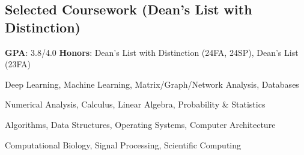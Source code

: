 
\subsection*{Selected Coursework (Dean's List with Distinction)}

\textbf{GPA}: 3.8/4.0 \quad \textbf{Honors}: Dean's List with Distinction (24FA, 24SP), Dean's List (23FA)

\begin{description}[leftmargin=5em, labelwidth=4.5em, labelsep=0.5em]
  \item[A+ Courses:] Deep Learning, Machine Learning, Matrix/Graph/Network Analysis, Databases
  \item[Mathematics:] Numerical Analysis, Calculus, Linear Algebra, Probability \& Statistics
  \item[Computer Science:] Algorithms, Data Structures, Operating Systems, Computer Architecture
  \item[Applied:] Computational Biology, Signal Processing, Scientific Computing
\end{description}



